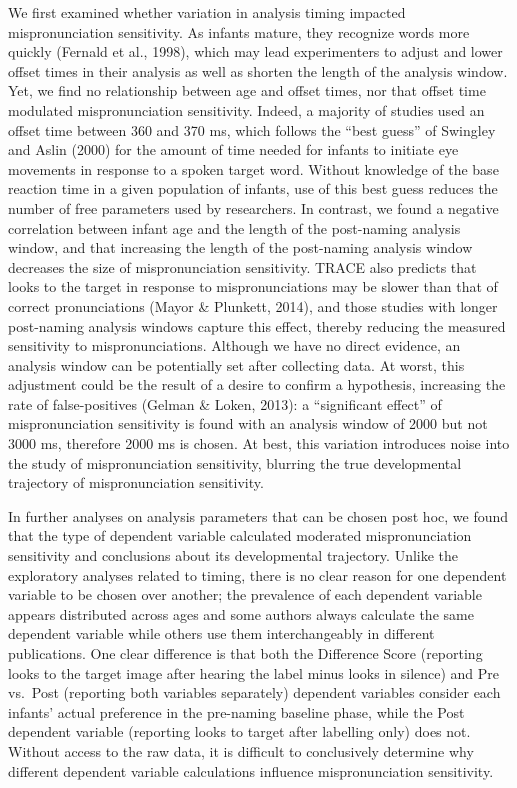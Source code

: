\documentclass[man]{apa6}
\begin{document}
We first examined whether variation in analysis timing impacted mispronunciation sensitivity. As infants mature, they recognize words more quickly (Fernald et al., 1998), which may lead experimenters to adjust and lower offset times in their analysis as well as shorten the length of the analysis window. Yet, we find no relationship between age and offset times, nor that offset time modulated mispronunciation sensitivity. Indeed, a majority of studies used an offset time between 360 and 370 ms, which follows the \enquote{best guess} of Swingley and Aslin (2000) for the amount of time needed for infants to initiate eye movements in response to a spoken target word. Without knowledge of the base reaction time in a given population of infants, use of this best guess reduces the number of free parameters used by researchers. In contrast, we found a negative correlation between infant age and the length of the post-naming analysis window, and that increasing the length of the post-naming analysis window decreases the size of mispronunciation sensitivity. TRACE also predicts that looks to the target in response to mispronunciations may be slower than that of correct pronunciations (Mayor \& Plunkett, 2014), and those studies with longer post-naming analysis windows capture this effect, thereby reducing the measured sensitivity to mispronunciations. Although we have no direct evidence, an analysis window can be potentially set after collecting data. At worst, this adjustment could be the result of a desire to confirm a hypothesis, increasing the rate of false-positives (Gelman \& Loken, 2013): a \enquote{significant effect} of mispronunciation sensitivity is found with an analysis window of 2000 but not 3000 ms, therefore 2000 ms is chosen. At best, this variation introduces noise into the study of mispronunciation sensitivity, blurring the true developmental trajectory of mispronunciation sensitivity.

In further analyses on analysis parameters that can be chosen post hoc, we found that the type of dependent variable calculated moderated mispronunciation sensitivity and conclusions about its developmental trajectory. Unlike the exploratory analyses related to timing, there is no clear reason for one dependent variable to be chosen over another; the prevalence of each dependent variable appears distributed across ages and some authors always calculate the same dependent variable while others use them interchangeably in different publications. One clear difference is that both the Difference Score (reporting looks to the target image after hearing the label minus looks in silence) and Pre vs.~Post (reporting both variables separately) dependent variables consider each infants' actual preference in the pre-naming baseline phase, while the Post dependent variable (reporting looks to target after labelling only) does not. Without access to the raw data, it is difficult to conclusively determine why different dependent variable calculations influence mispronunciation sensitivity.
\end{document}
